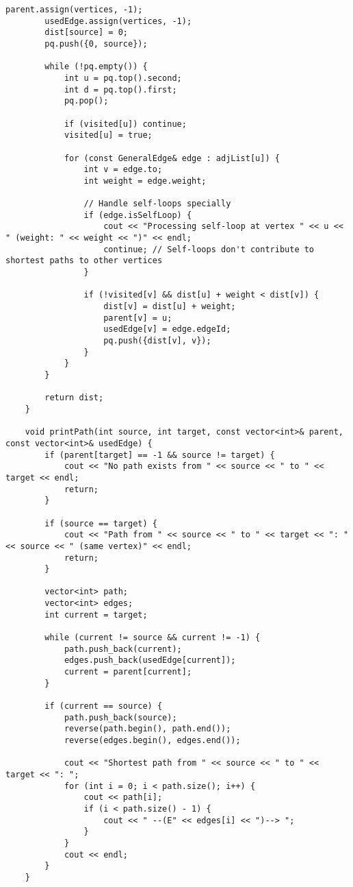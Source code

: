 \documentclass[12pt,a4paper]{article}
\begin{document}
\begin{lstlisting}[caption={Thuật toán Dijkstra cho đồ thị tổng quát}]
        parent.assign(vertices, -1);
        usedEdge.assign(vertices, -1);
        dist[source] = 0;
        pq.push({0, source});
        
        while (!pq.empty()) {
            int u = pq.top().second;
            int d = pq.top().first;
            pq.pop();
            
            if (visited[u]) continue;
            visited[u] = true;
            
            for (const GeneralEdge& edge : adjList[u]) {
                int v = edge.to;
                int weight = edge.weight;
                
                // Handle self-loops specially
                if (edge.isSelfLoop) {
                    cout << "Processing self-loop at vertex " << u << " (weight: " << weight << ")" << endl;
                    continue; // Self-loops don't contribute to shortest paths to other vertices
                }
                
                if (!visited[v] && dist[u] + weight < dist[v]) {
                    dist[v] = dist[u] + weight;
                    parent[v] = u;
                    usedEdge[v] = edge.edgeId;
                    pq.push({dist[v], v});
                }
            }
        }
        
        return dist;
    }
    
    void printPath(int source, int target, const vector<int>& parent, const vector<int>& usedEdge) {
        if (parent[target] == -1 && source != target) {
            cout << "No path exists from " << source << " to " << target << endl;
            return;
        }
        
        if (source == target) {
            cout << "Path from " << source << " to " << target << ": " << source << " (same vertex)" << endl;
            return;
        }
        
        vector<int> path;
        vector<int> edges;
        int current = target;
        
        while (current != source && current != -1) {
            path.push_back(current);
            edges.push_back(usedEdge[current]);
            current = parent[current];
        }
        
        if (current == source) {
            path.push_back(source);
            reverse(path.begin(), path.end());
            reverse(edges.begin(), edges.end());
            
            cout << "Shortest path from " << source << " to " << target << ": ";
            for (int i = 0; i < path.size(); i++) {
                cout << path[i];
                if (i < path.size() - 1) {
                    cout << " --(E" << edges[i] << ")--> ";
                }
            }
            cout << endl;
        }
    }
    

\end{lstlisting}
\end{document}

